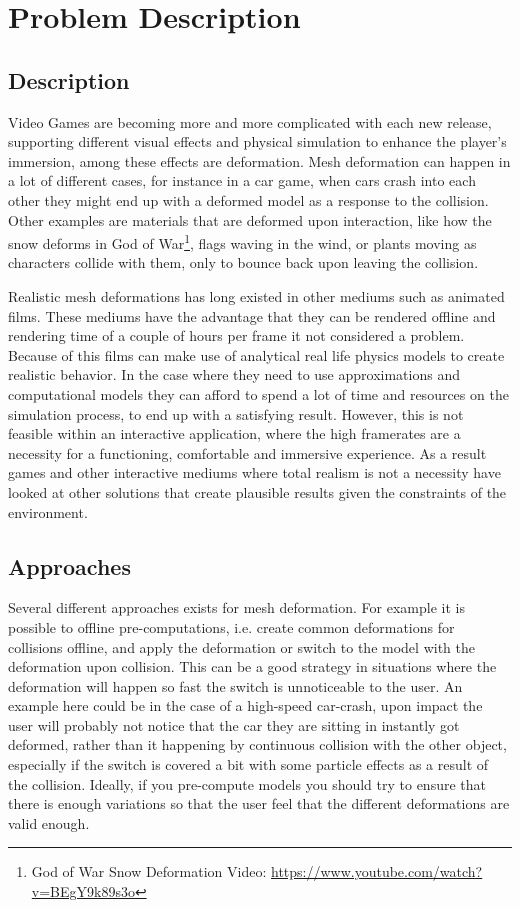 \chapter{Problem Description}
\section{Description}
Video Games are becoming more and more complicated with each new release, supporting different visual effects and physical simulation
to enhance the player's immersion, among these effects are deformation. 
Mesh deformation can happen in a lot of different cases, for instance in a car game, when cars crash into each other they might
end up with a deformed model as a response to the collision. 
Other examples are materials that are deformed upon interaction, like how the snow deforms in God of War\footnote{God of War Snow Deformation Video: \url{https://www.youtube.com/watch?v=BEgY9k89s3o}}, flags waving in the wind, or plants moving as characters collide with them, only to bounce back upon leaving the collision.

Realistic mesh deformations has long existed in other mediums such as animated films.
These mediums have the advantage that they can be rendered offline and rendering time of a couple of hours per frame
it not considered a problem. Because of this films can make use of analytical real life physics models to create realistic behavior.
In the case where they need to use approximations and computational models they can afford to spend a lot of time and resources on
the simulation process, to end up with a satisfying result.
However, this is not feasible within an interactive application, where the high framerates are a necessity for a functioning,
comfortable and immersive experience. As a result games and other interactive mediums where total realism is not a necessity
have looked at other solutions that create plausible results given the constraints of the environment.

\section{Approaches}
Several different approaches exists for mesh deformation.
For example it is possible to offline pre-computations, i.e. create common deformations for collisions offline, and apply the deformation or switch to the model with the deformation upon collision. 
This can be a good strategy in situations where the deformation will happen so fast the switch is unnoticeable to the user.
An example here could be in the case of a high-speed car-crash, upon impact the user will probably not notice that the car they are sitting in instantly got deformed,
rather than it happening by continuous collision with the other object, especially if the switch is covered a bit with some particle effects as a result of the collision.
Ideally, if you pre-compute models you should try to ensure that there is enough variations so that the user feel that the different deformations are valid enough.


